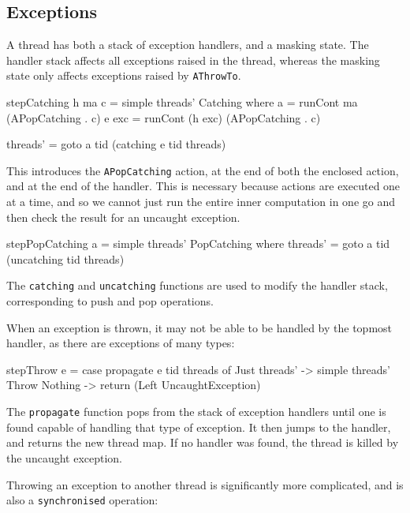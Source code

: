 \subsection{Exceptions}
\label{sec:execution-stepwise-exception}

A thread has both a stack of exception handlers, and a masking
state. The handler stack affects all exceptions raised in the thread,
whereas the masking state only affects exceptions raised by
\verb|AThrowTo|.

\begin{haskellcode}
stepCatching h ma c = simple threads' Catching where
  a     = runCont ma      (APopCatching . c)
  e exc = runCont (h exc) (APopCatching . c)

  threads' = goto a tid (catching e tid threads)
\end{haskellcode}

This introduces the \verb|APopCatching| action, at the end of both the
enclosed action, and at the end of the handler. This is necessary
because actions are executed one at a time, and so we cannot just run
the entire inner computation in one go and then check the result for
an uncaught exception.

\begin{haskellcode}
stepPopCatching a = simple threads' PopCatching where
  threads' = goto a tid (uncatching tid threads)
\end{haskellcode}

The \verb|catching| and \verb|uncatching| functions are used to modify
the handler stack, corresponding to push and pop operations.

When an exception is thrown, it may not be able to be handled by the
topmost handler, as there are exceptions of many types:

\begin{haskellcode}
stepThrow e = case propagate e tid threads of
    Just threads' -> simple threads' Throw
    Nothing -> return (Left UncaughtException)
\end{haskellcode}

The \verb|propagate| function pops from the stack of exception
handlers until one is found capable of handling that type of
exception. It then jumps to the handler, and returns the new thread
map. If no handler was found, the thread is killed by the uncaught
exception.

Throwing an exception to another thread is significantly more
complicated, and is also a \verb|synchronised| operation:

